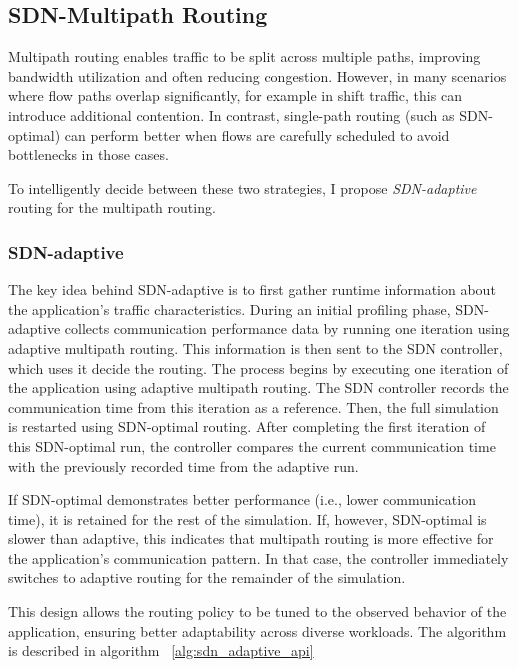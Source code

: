 \subsection{SDN-Multipath Routing}

Multipath routing enables traffic to be split across multiple paths, improving bandwidth utilization and often reducing congestion. However, in many scenarios where flow paths overlap significantly, for example in shift traffic, this can introduce additional contention. In contrast, single-path routing (such as SDN-optimal) can perform better when flows are carefully scheduled to avoid bottlenecks in those cases.

To intelligently decide between these two strategies, I propose \textit{SDN-adaptive} routing for the multipath routing.
\subsubsection{SDN-adaptive}
The key idea behind SDN-adaptive is to first gather runtime information about the application’s traffic characteristics. During an initial profiling phase, SDN-adaptive collects communication performance data by running one iteration using adaptive multipath routing. This information is then sent to the SDN controller, which uses it decide the routing.
The process begins by executing one iteration of the application using adaptive multipath routing. The SDN controller records the communication time from this iteration as a reference. Then, the full simulation is restarted using SDN-optimal routing. After completing the first iteration of this SDN-optimal run, the controller compares the current communication time with the previously recorded time from the adaptive run.

If SDN-optimal demonstrates better performance (i.e., lower communication time), it is retained for the rest of the simulation. If, however, SDN-optimal is slower than adaptive, this indicates that multipath routing is more effective for the application's communication pattern. In that case, the controller immediately switches to adaptive routing for the remainder of the simulation.

This design allows the routing policy to be tuned to the observed behavior of the application, ensuring better adaptability across diverse workloads. The algorithm is described in algorithm ~\ref{alg:sdn_adaptive_api}

